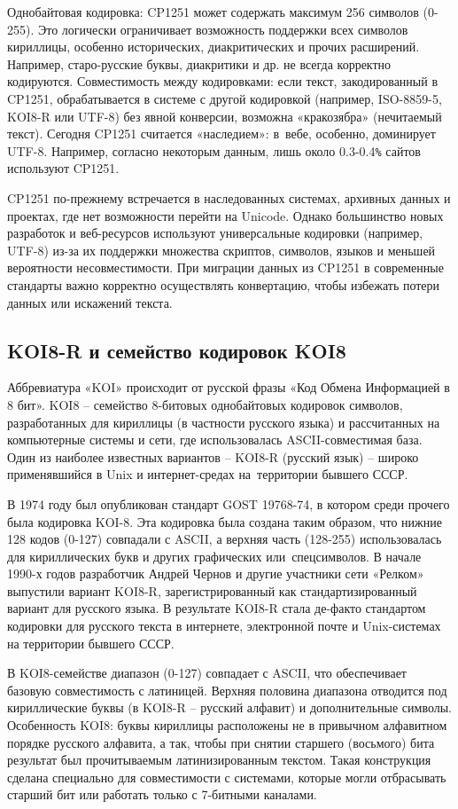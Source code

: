 \documentclass{ou}
\begin{document}
Однобайтовая кодировка: CP1251 может содержать максимум 256 символов (0-255). Это логически ограничивает возможность поддержки всех символов кириллицы, особенно исторических, диакритических и прочих расширений. Например, старо-русские буквы, диакритики и др. не всегда корректно кодируются. Совместимость между кодировками: если текст, закодированный в CP1251, обрабатывается в системе с другой кодировкой (например, ISO-8859-5, KOI8-R или UTF-8) без явной конверсии, возможна «кракозябра» (нечитаемый текст). Сегодня CP1251 считается «наследием»: в~вебе, особенно, доминирует UTF-8. Например, согласно некоторым данным, лишь около 0.3-0.4\verb|%| сайтов используют CP1251.

CP1251 по-прежнему встречается в наследованных системах, архивных данных и проектах, где нет возможности перейти на Unicode. Однако большинство новых разработок и веб-ресурсов используют универсальные кодировки (например, UTF-8) из-за их поддержки множества скриптов, символов, языков и меньшей вероятности несовместимости. При миграции данных из CP1251 в современные стандарты важно корректно осуществлять конвертацию, чтобы избежать потери данных или искажений текста.
\subsection{KOI8-R и семейство кодировок KOI8}
Аббревиатура «KOI» происходит от русской фразы «Код Обмена Информацией в 8 бит». KOI8 -- семейство 8-битовых однобайтовых кодировок символов, разработанных для кириллицы (в частности русского языка) и рассчитанных на компьютерные системы и сети, где использовалась ASCII-совместимая база. Один из наиболее известных вариантов -- KOI8-R (русский язык) -- широко применявшийся в Unix и интернет-средах на~территории бывшего СССР. 

В 1974 году был опубликован стандарт GOST 19768-74, в котором среди прочего была кодировка KOI-8. Эта кодировка была создана таким образом, что нижние 128 кодов (0-127) совпадали с ASCII, а верхняя часть (128-255) использовалась для кириллических букв и других графических или~спецсимволов. В начале 1990-х годов разработчик Андрей Чернов и другие участники сети «Релком» выпустили вариант KOI8-R, зарегистрированный как стандартизированный вариант для русского языка. В результате KOI8-R стала де-факто стандартом кодировки для русского текста в интернете, электронной почте и Unix-системах на территории бывшего СССР. 

В KOI8-семействе диапазон (0-127) совпадает с ASCII, что обеспечивает базовую совместимость с латиницей. Верхняя половина диапазона отводится под кириллические буквы (в KOI8-R -- русский алфавит) и дополнительные символы. Особенность KOI8: буквы кириллицы расположены не в привычном алфавитном порядке русского алфавита, а так, чтобы при снятии старшего (восьмого) бита результат был прочитываемым латинизированным текстом. Такая конструкция сделана специально для совместимости с системами, которые могли отбрасывать старший бит или работать только с 7-битными каналами. 
\end{document}
